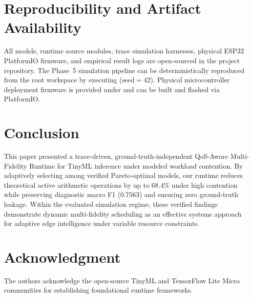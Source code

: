 \documentclass[journal]{IEEEtran}
\begin{document}
\section{Reproducibility and Artifact Availability}
All models, runtime source modules, trace simulation harnesses, physical ESP32 PlatformIO firmware, and empirical result logs are open-sourced in the project repository. The Phase~5 simulation pipeline can be deterministically reproduced from the root workspace by executing  ($\text{seed}=42$). Physical microcontroller deployment firmware is provided under  and can be built and flashed via PlatformIO.

\section{Conclusion}
This paper presented a trace-driven, ground-truth-independent QoS-Aware Multi-Fidelity Runtime for TinyML inference under modeled workload contention. By adaptively selecting among verified Pareto-optimal models, our runtime reduces theoretical active arithmetic operations by up to $68.4\%$ under high contention while preserving diagnostic macro F1 ($0.7563$) and ensuring zero ground-truth leakage. Within the evaluated simulation regime, these verified findings demonstrate dynamic multi-fidelity scheduling as an effective systems approach for adaptive edge intelligence under variable resource constraints.

\section*{Acknowledgment}
The authors acknowledge the open-source TinyML and TensorFlow Lite Micro communities for establishing foundational runtime frameworks.



\end{document}
